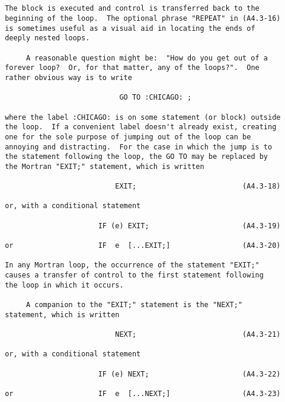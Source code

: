 \newpage \begin{verbatim}


 The block is executed and control is transferred back to the
 beginning of the loop.  The optional phrase "REPEAT" in (A4.3-16)
 is sometimes useful as a visual aid in locating the ends of
 deeply nested loops.

      A reasonable question might be:  "How do you get out of a
 forever loop?  Or, for that matter, any of the loops?".  One
 rather obvious way is to write

                            GO TO :CHICAGO: ;

 where the label :CHICAGO: is on some statement (or block) outside
 the loop.  If a convenient label doesn't already exist, creating
 one for the sole purpose of jumping out of the loop can be
 annoying and distracting.  For the case in which the jump is to
 the statement following the loop, the GO TO may be replaced by
 the Mortran "EXIT;" statement, which is written

                           EXIT;                         (A4.3-18)

 or, with a conditional statement

                       IF (e) EXIT;                      (A4.3-19)

 or                    IF  e  [...EXIT;]                 (A4.3-20)

 In any Mortran loop, the occurrence of the statement "EXIT;"
 causes a transfer of control to the first statement following
 the loop in which it occurs.

      A companion to the "EXIT;" statement is the "NEXT;"
 statement, which is written

                           NEXT;                         (A4.3-21)

 or, with a conditional statement

                       IF (e) NEXT;                      (A4.3-22)

 or                    IF  e  [...NEXT;]                 (A4.3-23)
\end{verbatim}
